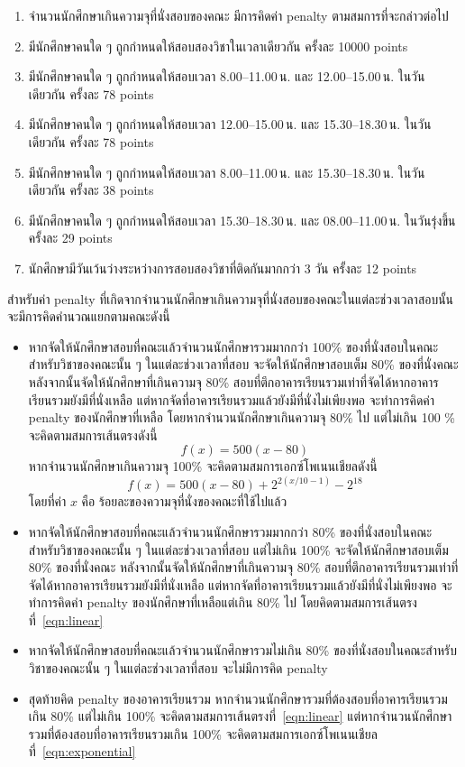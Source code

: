 \begin{enumerate}
    \item จํานวนนักศึกษาเกินความจุที่นั่งสอบของคณะ มีการคิดค่า penalty ตามสมการที่จะกล่าวต่อไป
    \item มีนักศึกษาคนใด ๆ ถูกกำหนดให้สอบสองวิชาในเวลาเดียวกัน ครั้งละ 10000 points
    \item มีนักศึกษาคนใด ๆ ถูกกำหนดให้สอบเวลา 8.00--11.00\,น. และ 12.00--15.00\,น. ในวันเดียวกัน ครั้งละ 78 points
    \item มีนักศึกษาคนใด ๆ ถูกกำหนดให้สอบเวลา 12.00--15.00\,น. และ 15.30--18.30\,น. ในวันเดียวกัน ครั้งละ 78 points
    \item มีนักศึกษาคนใด ๆ ถูกกำหนดให้สอบเวลา 8.00--11.00\,น. และ 15.30--18.30\,น. ในวันเดียวกัน ครั้งละ 38 points
    \item มีนักศึกษาคนใด ๆ ถูกกำหนดให้สอบเวลา 15.30--18.30\,น. และ 08.00--11.00\,น. ในวันรุ่งขึ้น ครั้งละ 29 points
    \item นักศึกษามีวันเว้นว่างระหว่างการสอบสองวิชาที่ติดกันมากกว่า 3 วัน ครั้งละ 12 points
\end{enumerate}
สำหรับค่า penalty ที่เกิดจากจำนวนนักศึกษาเกินความจุที่นั่งสอบของคณะในแต่ละช่วงเวลาสอบนั้นจะมีการคิดคำนวณแยกตามคณะดังนี้
\begin{itemize}
    \item หากจัดให้นักศึกษาสอบที่คณะแล้วจำนวนนักศึกษารวมมากกว่า 100\% ของที่นั่งสอบในคณะสำหรับวิชาของคณะนั้น ๆ ในแต่ละช่วงเวลาที่สอบ จะจัดให้นักศึกษาสอบเต็ม 80\% ของที่นั่งคณะ
    หลังจากนั้นจัดให้นักศึกษาที่เกินความจุ 80\% สอบที่ตึกอาคารเรียนรวมเท่าที่จัดได้หากอาคารเรียนรวมยังมีที่นั่งเหลือ แต่หากจัดที่อาคารเรียนรวมแล้วยังมีที่นั่งไม่เพียงพอ จะทำการคิดค่า penalty ของนักศึกษาที่เหลือ
    โดยหากจำนวนนักศึกษาเกินความจุ 80\% ไป แต่ไม่เกิน 100 \% จะคิดตามสมการเส้นตรงดังนี้ 
    \begin{equation}
    \label{eqn:linear}
        f(x)=500(x-80)
    \end{equation}
    หากจำนวนนักศึกษาเกินความจุ 100\% จะคิดตามสมการเอกซ์โพเนนเชียลดังนี้ 
    \begin{equation}
    \label{eqn:exponential}
        f(x)=500(x-80)+2^{2(x/10-1)}-2^{18}
    \end{equation}
    โดยที่ค่า $x$ คือ ร้อยละของความจุที่นั่งของคณะที่ใช้ไปแล้ว
    \item หากจัดให้นักศึกษาสอบที่คณะแล้วจำนวนนักศึกษารวมมากกว่า 80\% ของที่นั่งสอบในคณะสำหรับวิชาของคณะนั้น ๆ ในแต่ละช่วงเวลาที่สอบ แต่ไม่เกิน 100\% จะจัดให้นักศึกษาสอบเต็ม 80\% ของที่นั่งคณะ
    หลังจากนั้นจัดให้นักศึกษาที่เกินความจุ 80\% สอบที่ตึกอาคารเรียนรวมเท่าที่จัดได้หากอาคารเรียนรวมยังมีที่นั่งเหลือ แต่หากจัดที่อาคารเรียนรวมแล้วยังมีที่นั่งไม่เพียงพอ จะทำการคิดค่า penalty ของนักศึกษาที่เหลือแต่เกิน 80\% ไป
    โดยคิดตามสมการเส้นตรงที่~\ref{eqn:linear}
    \item หากจัดให้นักศึกษาสอบที่คณะแล้วจำนวนนักศึกษารวมไม่เกิน 80\% ของที่นั่งสอบในคณะสำหรับวิชาของคณะนั้น ๆ ในแต่ละช่วงเวลาที่สอบ จะไม่มีการคิด penalty
    \item สุดท้ายคิด penalty ของอาคารเรียนรวม หากจำนวนนักศึกษารวมที่ต้องสอบที่อาคารเรียนรวมเกิน 80\% แต่ไม่เกิน 100\% จะคิดตามสมการเส้นตรงที่~\ref{eqn:linear} แต่หากจำนวนนักศึกษารวมที่ต้องสอบที่อาคารเรียนรวมเกิน 100\% จะคิดตามสมการเอกซ์โพเนนเชียลที่~\ref{eqn:exponential}
\end{itemize}
